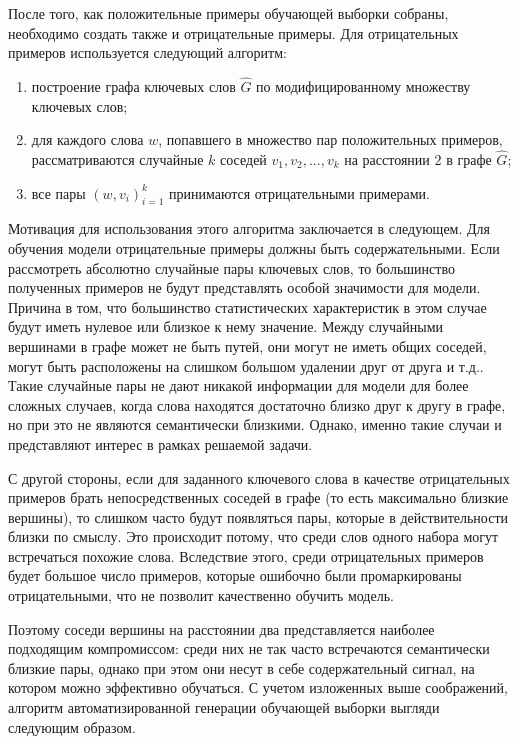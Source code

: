После того, как положительные примеры обучающей выборки собраны, необходимо создать также и отрицательные примеры. Для отрицательных примеров используется следующий алгоритм:
\begin{enumerate}
    \item построение графа ключевых слов $\hat{G}$ по модифицированному множеству ключевых слов;
    \item для каждого слова $w$, попавшего в множество пар положительных примеров, рассматриваются случайные $k$ соседей $v_1, v_2, ..., v_k$ на расстоянии $2$ в графе $\hat{G}$;
    \item все пары $(w, v_i)_{i=1}^k$ принимаются отрицательными примерами.
\end{enumerate}

Мотивация для использования этого алгоритма заключается в следующем. Для обучения модели отрицательные примеры должны быть содержательными. Если рассмотреть абсолютно случайные пары ключевых слов, то большинство полученных примеров не будут представлять особой значимости для модели. Причина в том, что большинство статистических характеристик в этом случае будут иметь нулевое или близкое к нему значение. Между случайными вершинами в графе может не быть путей, они могут не иметь общих соседей, могут быть расположены на слишком большом удалении друг от друга и т.д.. Такие случайные пары не дают никакой информации для модели для более сложных случаев, когда слова находятся достаточно близко друг к другу в графе, но при это не являются семантически близкими. Однако, именно такие случаи и представляют интерес в рамках решаемой задачи.

С другой стороны, если для заданного ключевого слова в качестве отрицательных примеров брать непосредственных соседей в графе (то есть максимально близкие вершины), то слишком часто будут появляться пары, которые в действительности близки по смыслу. Это происходит потому, что среди слов одного набора могут встречаться похожие слова. Вследствие этого, среди отрицательных примеров будет большое число примеров, которые ошибочно были промаркированы отрицательными, что не позволит качественно обучить модель.

Поэтому соседи вершины на расстоянии два представляется наиболее подходящим компромиссом: среди них не так часто встречаются семантически близкие пары, однако при этом они несут в себе содержательный сигнал, на котором можно эффективно обучаться. С учетом изложенных выше соображений, алгоритм автоматизированной генерации обучающей выборки выгляди следующим образом.

